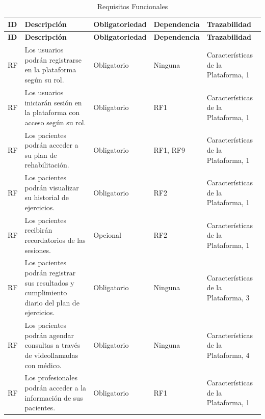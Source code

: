 \documentclass{article}
\begin{document}
	
\begin{longtable}{@{} p{1.5cm} p{5cm} p{3cm} p{2cm} p{3cm} @{}}
	\caption{Requisitos Funcionales}\\
	\toprule
	\textbf{ID} & \textbf{Descripción} & \textbf{Obligatoriedad} & \textbf{Dependencia} & \textbf{Trazabilidad} \\
	\midrule
	\endfirsthead
	
	\toprule
	\textbf{ID} & \textbf{Descripción} & \textbf{Obligatoriedad} & \textbf{Dependencia} & \textbf{Trazabilidad} \\
	\midrule
	\endhead
	
	\addlinespace 
	RF\therequisitosFuncionales & Los usuarios podrán registrarse en la plataforma según su rol. & Obligatorio & Ninguna & Características de la Plataforma, 1  \\
	\addlinespace \stepcounter{requisitosFuncionales}
	RF\therequisitosFuncionales & Los usuarios iniciarán sesión en la plataforma con acceso según su rol. & Obligatorio & RF1 & Características de la Plataforma, 1 \\  
	\addlinespace \stepcounter{requisitosFuncionales}
	RF\therequisitosFuncionales & Los pacientes podrán acceder a su plan de rehabilitación. & Obligatorio & RF1, RF9 & Características de la Plataforma, 1 \\ 
	\addlinespace \stepcounter{requisitosFuncionales}
	RF\therequisitosFuncionales & Los pacientes podrán visualizar su historial de ejercicios. & Obligatorio & RF2 & Características de la Plataforma, 1 \\ 
	\addlinespace \stepcounter{requisitosFuncionales}
	RF\therequisitosFuncionales & Los pacientes recibirán recordatorios de las sesiones. & Opcional & RF2 & Características de la Plataforma, 1 \\
	\addlinespace \stepcounter{requisitosFuncionales}
	RF\therequisitosFuncionales & Los pacientes podrán registrar sus resultados y cumplimiento diario del plan de ejercicios. & Obligatorio & Ninguna & Características de la Plataforma, 3 \\ 
	\addlinespace \stepcounter{requisitosFuncionales}
	RF\therequisitosFuncionales & Los pacientes podrán agendar consultas a través de videollamadas con médico. & Obligatorio & Ninguna & Características de la Plataforma, 4 \\
	\addlinespace \stepcounter{requisitosFuncionales}
	RF\therequisitosFuncionales & Los profesionales podrán acceder a la información de sus pacientes. & Obligatorio & RF1 & Características de la Plataforma, 1 \\ 

\end{longtable}
\end{document}
